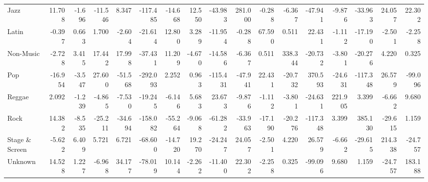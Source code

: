 \begin{table}
\begin{tabular}{lrrrrrrrrrrrrrrrr}
                  Jazz &  11.708 &            -1.696 &     -11.546 &      8.347 &    -117.485 &                 -14.668 &       12.550 &  -43.983 &  281.000 &  -0.288 &     -6.367 &  -47.941 &  -9.876 &  -33.963 &          24.057 &   22.302 \\
                 Latin &  -0.397 &             0.663 &       1.700 &     -2.604 &     -21.614 &                  12.800 &        3.289 &  -11.954 &   -0.288 &  67.590 &      0.511 &   22.431 &  -1.112 &  -17.190 &          -2.501 &   -2.258 \\
             Non-Music &  -2.728 &             3.415 &      17.442 &     17.998 &     -37.431 &                  11.209 &       -4.670 &  -14.586 &   -6.367 &   0.511 &    338.344 &  -20.732 &  -3.801 &  -20.276 &           4.220 &    0.325 \\
                   Pop & -16.954 &            -3.547 &      27.600 &    -51.568 &    -292.093 &                   2.252 &        0.963 & -115.431 &  -47.941 &  22.431 &    -20.732 &  370.593 & -24.631 & -117.348 &          26.579 &  -99.096 \\
                Reggae &   2.092 &            -1.239 &      -4.865 &     -7.530 &     -19.245 &                  -6.146 &        5.683 &   23.673 &   -9.876 &  -1.112 &     -3.801 &  -24.631 & 221.905 &    3.399 &          -6.662 &    9.680 \\
                  Rock &  14.382 &            -8.535 &     -25.211 &    -34.694 &    -158.082 &                 -55.264 &       -9.068 &  -61.282 &  -33.963 & -17.190 &    -20.276 & -117.348 &   3.399 &  385.130 &         -29.615 &    1.159 \\
        Stage \& Screen &  -5.622 &             6.409 &       5.721 &      6.721 &     -68.600 &                 -14.720 &       19.270 &  -24.247 &   24.057 &  -2.501 &      4.220 &   26.579 &  -6.662 &  -29.615 &         214.338 &  -24.757 \\
               Unknown &  14.528 &             1.227 &      -6.968 &     34.177 &     -78.019 &                  10.144 &       -2.262 &  -11.400 &   22.302 &  -2.258 &      0.325 &  -99.096 &   9.680 &    1.159 &         -24.757 &  183.188 \\
\bottomrule
\end{tabular}
\end{table}
